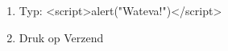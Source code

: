 \begin{enumerate}
  \item Typ: \textless script\textgreater alert("Wateva!")\textless /script\textgreater
  \item Druk op Verzend
\end{enumerate}